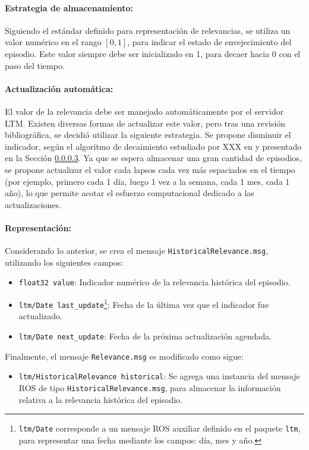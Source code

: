 \paragraph{Estrategia de almacenamiento:}
Siguiendo el estándar definido para representación de relevancias, se utiliza un valor numérico en el rango $[0, 1]$, para  indicar el estado de envejecimiento del episodio. Este valor siempre debe ser inicializado en 1, para decaer hacia 0 con el paso del tiempo.


\paragraph{Actualización automática:}
El valor de la relevancia debe ser manejado automáticamente por el servidor LTM. Existen diversas formas de actualizar este valor, pero tras una revisión bibliográfica, se decidió utilizar la siguiente estrategia. Se propone disminuir el indicador, según el algoritmo de decaimiento estudiado por XXX en \cite{} y presentado en la Sección \ref{}. Ya que se espera almacenar una gran cantidad de episodios, se propone actualizar el valor cada lapsos cada vez más espaciados en el tiempo (por ejemplo, primero cada 1 día, luego 1 vez a la semana, cada 1 mes, cada 1 año), lo que permite acotar el esfuerzo computacional dedicado a las actualizaciones.


\paragraph{Representación:}
Considerando lo anterior, se crea el mensaje \texttt{HistoricalRelevance.msg}, utilizando los siguientes campos:
\begin{itemize}
	\item \texttt{float32 value}: Indicador numérico de la relevancia histórica del episodio.
	\item \texttt{ltm/Date last\_update}\footnote{\texttt{ltm/Date} corresponde a un mensaje ROS auxiliar definido en el paquete \texttt{ltm}, para representar una fecha mediante los campos: día, mes y año.}: Fecha de la última vez que el indicador fue actualizado.
	\item \texttt{ltm/Date next\_update}: Fecha de la próxima actualización agendada.
\end{itemize}

Finalmente, el mensaje \texttt{Relevance.msg} es modificado como sigue:
\begin{itemize}
	\item \texttt{ltm/HistoricalRelevance historical}: Se agrega una instancia del mensaje ROS de tipo \texttt{HistoricalRelevance.msg}, para almacenar la información relativa a la relevancia histórica del episodio.
\end{itemize}



